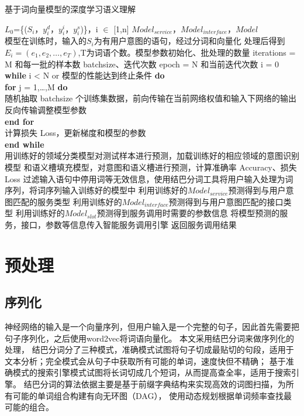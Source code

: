 \begin{algorithm}
  \caption{基于词向量模型的深度学习语义理解}
  \label{alg:suanfa1}
  \begin{algorithmic}[1]
  \Require $L_0$=\{($S_i$，$y_i^d$，$y_i^i$，$y_i^s$)\}，i $\in$ [1,n]   
  \Ensure $Model_{service}$，$Model_{interface}$，$Model_{}$\\
模型在训练时，输入的$S_i$为有用户意图的语句，经过分词和向量化
处理后得到$E_i=(e_1,e_2,\dots,e_T)$,T为词语个数。模型参数初始化、批处理的数量
iterations = M 和每一批的样本数 batchsize、迭代次数 epoch = N 和当前迭代次数 i = 0\\
\textbf{while} i < N or 模型的性能达到终止条件 \textbf{do}\\
\qquad \qquad \textbf{for} j = 1,\dots ,M \textbf{do}\\
\qquad \qquad \qquad \qquad 随机抽取 batchsize 个训练集数据，前向传输在当前网络权值和输入下网络的输出\\
\qquad \qquad \qquad \qquad 反向传输调整模型参数\\
\qquad \qquad \textbf{end for}\\
\qquad \qquad 计算损失 Loss，更新梯度和模型的参数\\
\textbf{end while}\\
用训练好的领域分类模型对测试样本进行预测，加载训练好的相应领域的意图识别模型
和语义槽填充模型，对意图和语义槽进行预测，计算准确率 Accuracy、损失 Loss
  \State 过滤输入语句中停用词等无效信息，使用结巴分词工具将用户输入处理为词序列，将词序列输入训练好的模型中
  \State 利用训练好的$Model_{service}$预测得到与用户意图匹配的服务类型
  \State 利用训练好的$Model_{interface}$预测得到与用户意图匹配的接口类型
  \State 利用训练好的$Model_{slot}$预测得到服务调用时需要的参数信息
  \State 将模型预测的服务，接口，参数等信息传入智能服务调用引擎
  \State 返回服务调用结果
  \end{algorithmic}
  \end{algorithm}

\section{预处理}
\subsection{序列化}
神经网络的输入是一个向量序列，但用户输入是一个完整的句子，因此首先需要把句子序列化，之后使用word2vec将词语向量化。
本文采用结巴分词来做序列化的处理，
结巴分词分了三种模式，准确模式试图将句子切成最贴切的句段，适用于文本分析；完全模式会从句子中获取所有可能的单词，速度快但不精确；
基于准确模式的搜索引擎模式试图将长词切成几个短词，从而提高查全率，适用于搜索引擎。
结巴分词的算法依据主要是基于前缀字典结构来实现高效的词图扫描，为所有可能的单词组合构建有向无环图（DAG），
使用动态规划根据单词频率查找最可能的组合。

